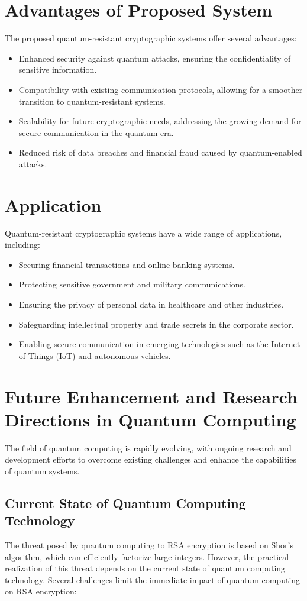 \documentclass[12pt,a4paper]{report}
\begin{document}
\chapter{Advantages of Proposed System}
The proposed quantum-resistant cryptographic systems offer several advantages:
\begin{itemize}
    \item Enhanced security against quantum attacks, ensuring the confidentiality of sensitive information.
    \item Compatibility with existing communication protocols, allowing for a smoother transition to quantum-resistant systems.
    \item Scalability for future cryptographic needs, addressing the growing demand for secure communication in the quantum era.
    \item Reduced risk of data breaches and financial fraud caused by quantum-enabled attacks.
\end{itemize}

\chapter{Application}
Quantum-resistant cryptographic systems have a wide range of applications, including:
\begin{itemize}
    \item Securing financial transactions and online banking systems.
    \item Protecting sensitive government and military communications.
    \item Ensuring the privacy of personal data in healthcare and other industries.
    \item Safeguarding intellectual property and trade secrets in the corporate sector.
    \item Enabling secure communication in emerging technologies such as the Internet of Things (IoT) and autonomous vehicles.
\end{itemize}

\chapter{Future Enhancement and Research Directions in Quantum Computing}
The field of quantum computing is rapidly evolving, with ongoing research and development efforts to overcome existing challenges and enhance the capabilities of quantum systems. 

\section{Current State of Quantum Computing Technology}
\label{sec:challenge_quantum_computing}
The threat posed by quantum computing to RSA encryption is based on Shor's algorithm, which can efficiently factorize large integers. However, the practical realization of this threat depends on the current state of quantum computing technology. Several challenges limit the immediate impact of quantum computing on RSA encryption:
\end{document}
